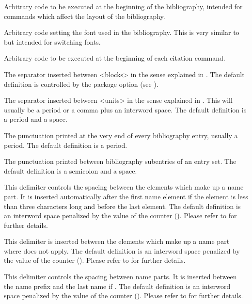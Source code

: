 \documentclass{ltxdockit}[2011/03/25]
\begin{document}
\begin{ltxsyntax}

Arbitrary code to be executed at the beginning of the bibliography, intended for commands which affect the layout of the bibliography.

Arbitrary code setting the font used in the bibliography. This is very similar to  but intended for switching fonts.

Arbitrary code to be executed at the beginning of each citation command.

The separator inserted between <blocks> in the sense explained in . The default definition is controlled by the package option  (see ).

The separator inserted between <units> in the sense explained in . This will usually be a period or a comma plus an interword space. The default definition is a period and a space.

The punctuation printed at the very end of every bibliography entry, usually a period. The default definition is a period.

\BiberOnlyMark
The punctuation printed between bibliography subentries of an entry set. The default definition is a semicolon and a space.

\BiberOnlyMark
This delimiter controls the spacing between the elements which make up a name part. It is inserted automatically after the first name element if the element is less than three characters long and before the last element. The default definition is an interword space penalized by the value of the  counter (). Please refer to  for further details.

\BiberOnlyMark
This delimiter is inserted between the elements which make up a name part where  does not apply. The default definition is an interword space penalized by the value of the  counter (). Please refer to  for further details.

This delimiter controls the spacing between name parts. It is inserted between the name prefix and the last name if . The default definition is an interword space penalized by the value of the  counter (). Please refer to  for further details.


\end{ltxsyntax}
\end{document}
